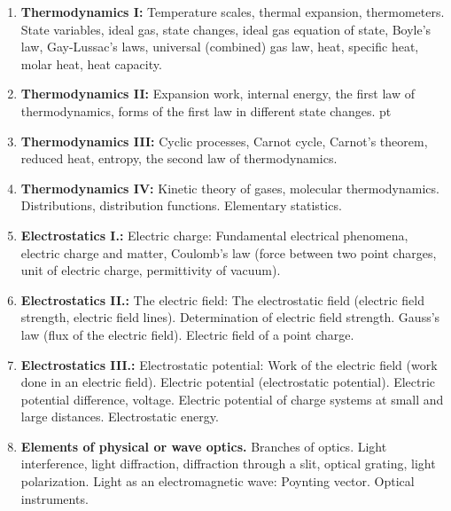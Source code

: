 \documentclass[t,aspectratio=169]{beamer}
\begin{document}
\begin{frame}
\begin{enumerate}
\item \textbf{Thermodynamics I:} Temperature scales, thermal expansion, thermometers. State variables, ideal gas, state changes, ideal gas equation of state, Boyle’s law, Gay-Lussac’s laws, universal (combined) gas law, heat, specific heat, molar heat, heat capacity.
\item \textbf{Thermodynamics II:} Expansion work, internal energy, the first law of thermodynamics, forms of the first law in different state changes.
\pagebreak
{} pt
\item \textbf{Thermodynamics III:} Cyclic processes, Carnot cycle, Carnot’s theorem, reduced heat, entropy, the second law of thermodynamics.
\item \textbf{Thermodynamics IV:} Kinetic theory of gases, molecular thermodynamics. Distributions, distribution functions. Elementary statistics.
\item \textbf{Electrostatics I.:} Electric charge: Fundamental electrical phenomena, electric charge and matter, Coulomb’s law (force between two point charges, unit of electric charge, permittivity of vacuum).
\item \textbf{Electrostatics II.:} The electric field: The electrostatic field (electric field strength, electric field lines). Determination of electric field strength. Gauss’s law (flux of the electric field). Electric field of a point charge.
\pagebreak
\item \textbf{Electrostatics III.:} Electrostatic potential: Work of the electric field (work done in an electric field). Electric potential (electrostatic potential). Electric potential difference, voltage. Electric potential of charge systems at small and large distances. Electrostatic energy.
\item \textbf{Elements of physical or wave optics.} Branches of optics. Light interference, light diffraction, diffraction through a slit, optical grating, light polarization. Light as an electromagnetic wave: Poynting vector. Optical instruments.
\end{enumerate}
\end{frame}

\end{document}
